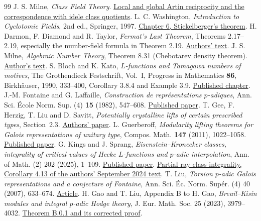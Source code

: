 \documentclass[a4paper,11pt]{article}
\theoremstyle{definition}
\theoremstyle{remark}
\numberwithin{equation}{section}
\begin{document}
\begin{thebibliography}{99}
 J. S. Milne, \emph{Class Field Theory}. \href{https://www.jmilne.org/math/CourseNotes/CFT.pdf}{Local and global Artin reciprocity and the correspondence with idele class quotients}.
 L. C. Washington, \emph{Introduction to Cyclotomic Fields}, 2nd ed., Springer, 1997. \href{https://link.springer.com/book/10.1007/978-1-4612-1934-7}{Chapter 6, Stickelberger's theorem}.
 H. Darmon, F. Diamond and R. Taylor, \emph{Fermat's Last Theorem}, Theorems 2.17--2.19, especially the number-field formula in Theorem 2.19. \href{https://www.math.mcgill.ca/darmon/pub/Articles/Expository/05.DDT/paper.pdf}{Authors' text}.
 J. S. Milne, \emph{Algebraic Number Theory}, Theorem 8.31 (Chebotarev density theorem). \href{https://www.jmilne.org/math/CourseNotes/ANT301.pdf}{Author's text}.
 S. Bloch and K. Kato, \emph{\(L\)-functions and Tamagawa numbers of motives}, The Grothendieck Festschrift, Vol.~I, Progress in Mathematics \textbf{86}, Birkh\"auser, 1990, 333--400, Corollary 3.8.4 and Example 3.9. \href{https://virtualmath1.stanford.edu/~conrad/BSDseminar/refs/BKTamagawa.pdf}{Published chapter}.
 J.-M. Fontaine and G. Laffaille, \emph{Construction de représentations \(p\)-adiques}, Ann. Sci. École Norm. Sup. (4) \textbf{15} (1982), 547--608. \href{https://www.numdam.org/articles/10.24033/asens.1437/}{Published paper}.
 T. Gee, F. Herzig, T. Liu and D. Savitt, \emph{Potentially crystalline lifts of certain prescribed types}, Section~2.3. \href{https://math.jhu.edu/~savitt/papers/pdfs/FLlifts.pdf}{Authors' paper}.
 L. Guerberoff, \emph{Modularity lifting theorems for Galois representations of unitary type}, Compos. Math. \textbf{147} (2011), 1022--1058. \href{https://doi.org/10.1112/S0010437X10005154}{Published paper}.
 G. Kings and J. Sprang, \emph{Eisenstein--Kronecker classes, integrality of critical values of Hecke \(L\)-functions and \(p\)-adic interpolation}, Ann. of Math. (2) 202 (2025), 1--109. \href{https://annals.math.princeton.edu/2025/202-1/p01}{Published paper}. \href{https://arxiv.org/pdf/1912.03657\#page=52}{Partial ray-class integrality, Corollary 4.13 of the authors' September 2024 text}.
 T. Liu, \emph{Torsion \(p\)-adic Galois representations and a conjecture of Fontaine}, Ann. Sci. Éc. Norm. Supér. (4) 40 (2007), 633--674. \href{https://www.numdam.org/item/ASENS_2007_4_40_4_633_0/}{Article}.
 H. Gao and T. Liu, Appendix B to H. Gao, \emph{Breuil--Kisin modules and integral \(p\)-adic Hodge theory}, J. Eur. Math. Soc. 25 (2023), 3979--4032. \href{https://doi.org/10.4171/JEMS/1278}{Theorem B.0.1 and its corrected proof}.
\end{thebibliography}\endgroup
\end{document}
